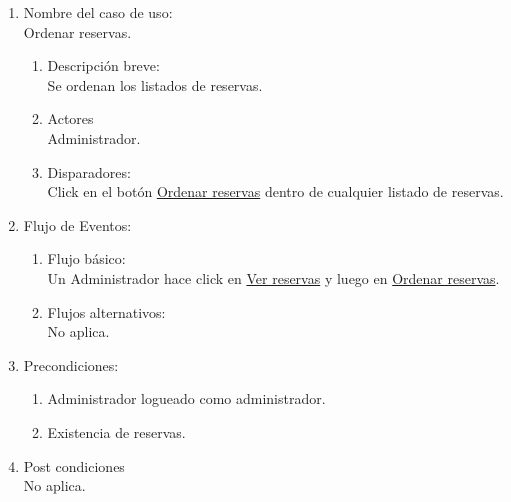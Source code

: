 \documentclass[a4paper,11pt]{article}
\begin{document}
\begin{enumerate}

    \item Nombre del caso de uso: \\
    Ordenar reservas.

    \begin{enumerate}
    \item Descripción breve: \\
        Se ordenan los listados de reservas.
    \item Actores \\
        Administrador.
    \item Disparadores: \\
        Click en el botón \underline{Ordenar reservas}
        dentro de cualquier listado de reservas.
    \end{enumerate}

    \item Flujo de Eventos: \\

    \begin{enumerate}

        \item Flujo básico:\\
            Un Administrador hace click en \underline{Ver reservas} y luego
            en \underline{Ordenar reservas}.
        \item Flujos alternativos:\\
            No aplica.
    \end{enumerate}

    \item Precondiciones: \\
        \begin{enumerate}
            \item Administrador logueado como administrador.
            \item Existencia de reservas.
        \end{enumerate}

    \item Post condiciones \\
        No aplica.

\end{enumerate}
\end{document}
